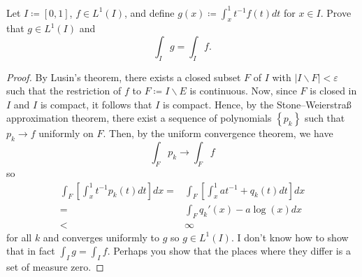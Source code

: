\begin{problem}
Let $I\coloneqq[0,1]$, $f\in L^1(I)$, and define $g(x)\coloneqq\int_x^1
t^{-1}f(t) d  t$ for $x\in I$. Prove that $g\in L^1(I)$ and
\[
\int_I g=\int_I f.
\]
\end{problem}
\begin{proof}
By Lusin's theorem, there exists a closed subset $F$ of $I$ with $|I\smallsetminus
F|<\varepsilon$ such that the restriction of $f$ to $F\coloneqq I\smallsetminus E$
is continuous. Now, since $F$ is closed in $I$ and $I$ is compact, it
follows that $I$ is compact. Hence, by the Stone--Weierstraß approximation
theorem, there exist a sequence of polynomials $\left\{ p_k \right\}$ such
that $p_k\to f$ uniformly on $F$. Then, by the uniform convergence theorem,
we have
\begin{equation}
  \label{eq:uniform-convergence-2-4}
\int_F p_k\longrightarrow \int_F f
\end{equation}
so
\begin{equation}
  \label{eq:uniform-convergence-2-2-4}
\begin{aligned}
\int_F\left[\int_x^1t^{-1}p_k(t) d  t\right] d  x
={}&\int_F\left[\int_x^1 at^{-1}+q_k(t) d  t\right] d  x\\
={}&\int_F q_k'(x)-a\log(x) d  x\\
<{}&\infty
\end{aligned}
\end{equation}
for all $k$ and converges uniformly to $g$ so $g\in L^1(I)$. I don't know
how to show that in fact $\int_I g=\int_I f$. Perhaps you show that the
places where they differ is a set of measure zero.
\end{proof}

